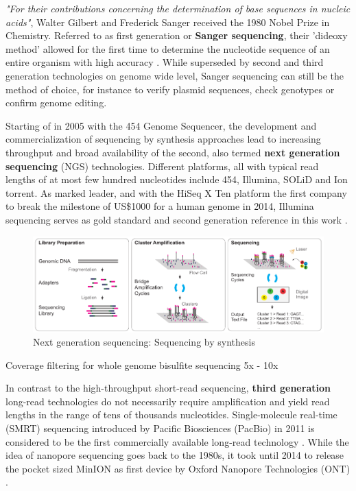 \textit{"For their contributions concerning the determination of base sequences in nucleic acids"}, Walter Gilbert and Frederick Sanger received the 1980 Nobel Prize in Chemistry.
Referred to as first generation or \textbf{Sanger sequencing}, their 'dideoxy method' allowed for the first time to determine the nucleotide sequence of an entire organism with high accuracy \cite{Sanger1977}.
While superseded by second and third generation technologies on genome wide level, Sanger sequencing can still be the method of choice, for instance to verify plasmid sequences, check genotypes or confirm genome editing.

Starting of in 2005 with the 454 Genome Sequencer, the development and commercialization of sequencing by synthesis approaches lead to increasing throughput and broad availability of the second, also termed \textbf{next generation sequencing} (NGS) technologies.
Different platforms, all with typical read lengths of at most few hundred nucleotides include 454, Illumina, SOLiD and Ion torrent.
As marked leader, and with the HiSeq X Ten platform the first company to break the milestone of US\$1000 for a human genome in 2014, Illumina sequencing serves as gold standard and second generation reference in this work \cite{Dijk2014}.



\begin{figure}[h]
	\centering
	\includegraphics[width=1.0\textwidth]{figures/intro/sbs.pdf}
	\captionsetup{format=plain}
	\caption[Sequencing by synthesis]{Next generation sequencing: Sequencing by synthesis}
	\label{fig:intro:sbs}
\end{figure}

Coverage filtering for whole genome bisulfite sequencing 5x - 10x \cite{Ziller2015}

In contrast to the high-throughput short-read sequencing, \textbf{third generation} long-read technologies do not necessarily require amplification and yield read lengths in the range of tens of thousands nucleotides. 
Single-molecule real-time (SMRT) sequencing introduced by Pacific Biosciences (PacBio) in 2011 is considered to be the first commercially available long-read technology \cite{Dijk2018}.
While the idea of nanopore sequencing goes back to the 1980s, it took until 2014 to release the pocket sized MinION as first device by Oxford Nanopore Technologies (ONT) \cite{Deamer2016}.

